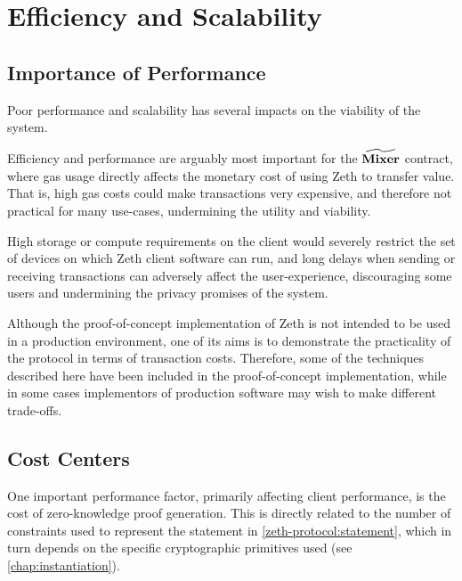 
\section{Efficiency and Scalability}\label{implementation:efficiency}

\newcommand{\primeF}{\ensuremath{\algostyle{prime}}\xspace}
\newcommand{\decF}{\ensuremath{\algostyle{dec}}\xspace}
\newcommand{\getsigma}{\ensuremath{\algostyle{getSigma}}\xspace}

\subsection{Importance of Performance}\label{implementation:efficiency:importance-of-performance}

Poor performance and scalability has several impacts on the viability of the system.

Efficiency and performance are arguably most important for the $\widetilde{\mathbf{Mixer}}$ contract, where gas usage directly affects the monetary cost of using Zeth to transfer value. That is, high gas costs could make transactions very expensive, and therefore not practical for many use-cases, undermining the utility and viability.

High storage or compute requirements on the client would severely restrict the set of devices on which Zeth client software can run, and long delays when sending or receiving transactions can adversely affect the user-experience, discouraging some users and undermining the privacy promises of the system.

Although the proof-of-concept implementation of Zeth is not intended to be used in a production environment, one of its aims is to demonstrate the practicality of the protocol in terms of transaction costs. Therefore, some of the techniques described here have been included in the proof-of-concept implementation, while in some cases implementors of production software may wish to make different trade-offs.

\subsection{Cost Centers}\label{implementation:efficiency:cost-centers}

One important performance factor, primarily affecting client performance, is the cost of zero-knowledge proof generation. This is directly related to the number of constraints used to represent the statement in \cref{zeth-protocol:statement}, which in turn depends on the specific cryptographic primitives used (see \cref{chap:instantiation}).

